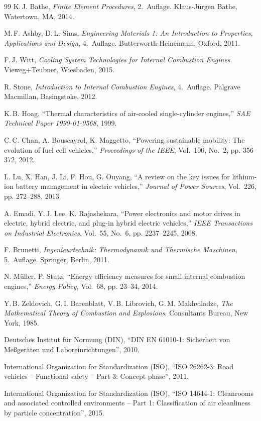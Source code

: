 ﻿\documentclass[a4paper,12pt]{article}
\begin{document}
\begin{thebibliography}{99}
	K.\,J. Bathe,
	\textit{Finite Element Procedures}, 2.~Auflage.
	Klaus-Jürgen Bathe, Watertown, MA, 2014.
	
	M.\,F. Ashby, D.\,L. Sims,
	\textit{Engineering Materials 1: An Introduction to Properties, Applications and Design}, 4.~Auflage.
	Butterworth-Heinemann, Oxford, 2011.
	
	F.\,J. Witt,
	\textit{Cooling System Technologies for Internal Combustion Engines}.
	Vieweg+Teubner, Wiesbaden, 2015.
	
	R. Stone,
	\textit{Introduction to Internal Combustion Engines}, 4.~Auflage.
	Palgrave Macmillan, Basingstoke, 2012.
	
	K.\,B. Hoag,
	``Thermal characteristics of air-cooled single-cylinder engines,''
	\textit{SAE Technical Paper 1999-01-0568}, 1999.
	
	C.\,C. Chan, A. Bouscayrol, K. Maggetto,
	``Powering sustainable mobility: The evolution of fuel cell vehicles,''
	\textit{Proceedings of the IEEE}, Vol.~100, No.~2, pp. 356--372, 2012.
	
	L. Lu, X. Han, J. Li, F. Hou, G. Ouyang,
	``A review on the key issues for lithium-ion battery management in electric vehicles,''
	\textit{Journal of Power Sources}, Vol.~226, pp. 272--288, 2013.
	
	A. Emadi, Y.\,J. Lee, K. Rajashekara,
	``Power electronics and motor drives in electric, hybrid electric, and plug-in hybrid electric vehicles,''
	\textit{IEEE Transactions on Industrial Electronics}, Vol.~55, No.~6, pp. 2237--2245, 2008.
	
	F. Brunetti,
	\textit{Ingenieurtechnik: Thermodynamik und Thermische Maschinen}, 5.~Auflage.
	Springer, Berlin, 2011.
	
	N. Müller, P. Stutz,
	``Energy efficiency measures for small internal combustion engines,''
	\textit{Energy Policy}, Vol.~68, pp. 23--34, 2014.
	
	Y.\,B. Zeldovich, G.\,I. Barenblatt, V.\,B. Librovich, G.\,M. Makhviladze,
	\textit{The Mathematical Theory of Combustion and Explosions}.
	Consultants Bureau, New York, 1985.
	
	Deutsches Institut für Normung (DIN),
	``DIN EN 61010-1: Sicherheit von Meßgeräten und Laboreinrichtungen'',
	2010.
	
	International Organization for Standardization (ISO),
	``ISO 26262-3: Road vehicles -- Functional safety -- Part 3: Concept phase'',
	2011.
	
	International Organization for Standardization (ISO),
	``ISO 14644-1: Cleanrooms and associated controlled environments -- Part 1: Classification of air cleanliness by particle concentration'',
	2015.
	
\end{thebibliography}
\end{document}
